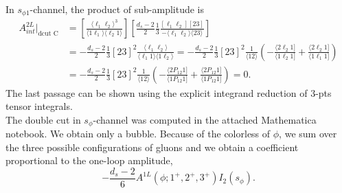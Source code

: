 \documentclass{article}
\numberwithin{equation}{section}
\begin{document}
In $s_{\phi 1}$-channel, the product of sub-amplitude is
\begin{align*}
	A^{2L}_{int}|_{\text{dcut C}}&=\left[\frac{\langle \ell_1 \ell_2 \rangle^3}{\langle 1 \ell_1 \rangle \langle \ell_2 1 \rangle}\right] \left[ \frac{d_s-2}{2}\frac{1}{3}\frac{[\ell_1\ell_2][23]}{-\langle \ell_1 \ell_2 \rangle\langle 23 \rangle}\right]\\
	&=-\frac{d_s-2}{2}\frac{1}{3}[23]^2 \frac{\langle \ell_1 \ell_2 \rangle}{\langle \ell_1 1 \rangle \langle 1 \ell_2 \rangle}=-\frac{d_s-2}{2}\frac{1}{3}[23]^2 \frac{1}{\langle 12 \rangle}\left(-\frac{\langle 2 \ell_2 1]}{\langle 1 \ell_2 1]}+\frac{\langle 2 \ell_2 1 ]}{\langle 1 \ell_1 1]}\right)\\
	&=-\frac{d_s-2}{2}\frac{1}{3}[23]^2 \frac{1}{\langle 12 \rangle}\left(-\frac{\langle 2 P_{12} 1]}{\langle 1 P_{12} 1]}+\frac{\langle 2 P_{12} 1 ]}{\langle 1 P_{12} 1]}\right)=0.
\end{align*}
The last passage can be shown using the explicit integrand reduction of 3-pts tensor integrals.\\

\noindent The double cut in $s_\phi$-channel was computed in the attached Mathematica notebook. We obtain only a bubble. Because of the colorless of $\phi$, we sum over the three possible configurations of gluons and we obtain a coefficient proportional to the one-loop amplitude,
$$
	-\frac{d_s-2}{6} A^{1L}(\phi;1^+,2^+,3^+) I_2(s_\phi).
$$
%
\end{document}
